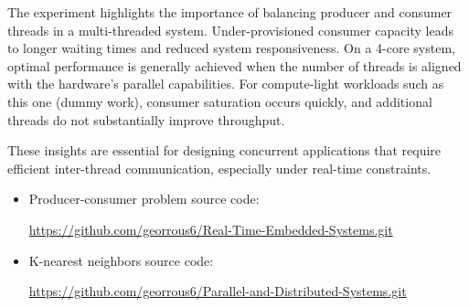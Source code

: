 \documentclass[11pt]{article}
\begin{document}
The experiment highlights the importance of balancing producer and consumer threads in a multi-threaded system. 
Under-provisioned consumer capacity leads to longer waiting times and reduced system responsiveness. On a 4-core 
system, optimal performance is generally achieved when the number of threads is aligned with the hardware's 
parallel capabilities. For compute-light workloads such as this one (dummy work), consumer saturation occurs 
quickly, and additional threads do not substantially improve throughput.

These insights are essential for designing concurrent applications that require efficient inter-thread communication, 
especially under real-time constraints.

\begin{itemize}
    \item Producer-consumer problem source code: 
    
    \url{https://github.com/georrous6/Real-Time-Embedded-Systems.git}
    \item K-nearest neighbors source code: 
    
    \url{https://github.com/georrous6/Parallel-and-Distributed-Systems.git}
\end{itemize}
\end{document}
